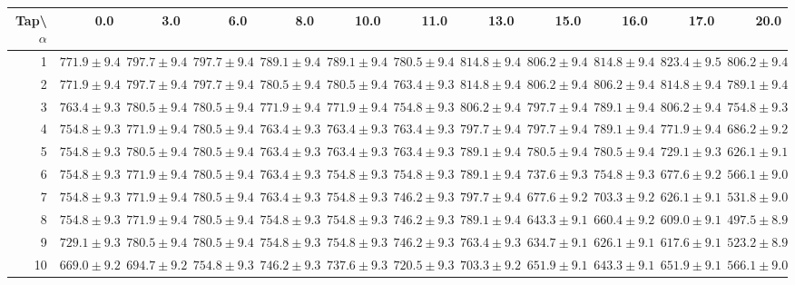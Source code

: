 \documentclass[runningheads]{llncs}
\begin{document}
\begin{table}
\begin{center}
\begin{tabular}{rrrrrrrrrrrr}
\toprule
{}Tap\textbackslash$\alpha$ &           0.0  &           3.0  &           6.0  &           8.0  &           10.0 &    
       11.0 &           13.0 &           15.0 &           16.0 &           17.0 &           20.0 \\
\midrule
1  &  $771.9\pm9.4$ &  $797.7\pm9.4$ &  $797.7\pm9.4$ &  $789.1\pm9.4$ &  $789.1\pm9.4$ &  $780.5\pm9.4$ &  $814.8\pm9.4$ &  $806.2\pm9.4$ &  $814.8\pm9.4$ &  $823.4\pm9.5$ &  $806.2\pm9.4$ \\
2  &  $771.9\pm9.4$ &  $797.7\pm9.4$ &  $797.7\pm9.4$ &  $780.5\pm9.4$ &  $780.5\pm9.4$ &  $763.4\pm9.3$ &  $814.8\pm9.4$ &  $806.2\pm9.4$ &  $806.2\pm9.4$ &  $814.8\pm9.4$ &  $789.1\pm9.4$ \\
3  &  $763.4\pm9.3$ &  $780.5\pm9.4$ &  $780.5\pm9.4$ &  $771.9\pm9.4$ &  $771.9\pm9.4$ &  $754.8\pm9.3$ &  $806.2\pm9.4$ &  $797.7\pm9.4$ &  $789.1\pm9.4$ &  $806.2\pm9.4$ &  $754.8\pm9.3$ \\
4  &  $754.8\pm9.3$ &  $771.9\pm9.4$ &  $780.5\pm9.4$ &  $763.4\pm9.3$ &  $763.4\pm9.3$ &  $763.4\pm9.3$ &  $797.7\pm9.4$ &  $797.7\pm9.4$ &  $789.1\pm9.4$ &  $771.9\pm9.4$ &  $686.2\pm9.2$ \\
5  &  $754.8\pm9.3$ &  $780.5\pm9.4$ &  $780.5\pm9.4$ &  $763.4\pm9.3$ &  $763.4\pm9.3$ &  $763.4\pm9.3$ &  $789.1\pm9.4$ &  $780.5\pm9.4$ &  $780.5\pm9.4$ &  $729.1\pm9.3$ &  $626.1\pm9.1$ \\
6  &  $754.8\pm9.3$ &  $771.9\pm9.4$ &  $780.5\pm9.4$ &  $763.4\pm9.3$ &  $754.8\pm9.3$ &  $754.8\pm9.3$ &  $789.1\pm9.4$ &  $737.6\pm9.3$ &  $754.8\pm9.3$ &  $677.6\pm9.2$ &  $566.1\pm9.0$ \\
7  &  $754.8\pm9.3$ &  $771.9\pm9.4$ &  $780.5\pm9.4$ &  $763.4\pm9.3$ &  $754.8\pm9.3$ &  $746.2\pm9.3$ &  $797.7\pm9.4$ &  $677.6\pm9.2$ &  $703.3\pm9.2$ &  $626.1\pm9.1$ &  $531.8\pm9.0$ \\
8  &  $754.8\pm9.3$ &  $771.9\pm9.4$ &  $780.5\pm9.4$ &  $754.8\pm9.3$ &  $754.8\pm9.3$ &  $746.2\pm9.3$ &  $789.1\pm9.4$ &  $643.3\pm9.1$ &  $660.4\pm9.2$ &  $609.0\pm9.1$ &  $497.5\pm8.9$ \\
9  &  $729.1\pm9.3$ &  $780.5\pm9.4$ &  $780.5\pm9.4$ &  $754.8\pm9.3$ &  $754.8\pm9.3$ &  $746.2\pm9.3$ &  $763.4\pm9.3$ &  $634.7\pm9.1$ &  $626.1\pm9.1$ &  $617.6\pm9.1$ &  $523.2\pm8.9$ \\
10 &  $669.0\pm9.2$ &  $694.7\pm9.2$ &  $754.8\pm9.3$ &  $746.2\pm9.3$ &  $737.6\pm9.3$ &  $720.5\pm9.3$ &  $703.3\pm9.2$ &  $651.9\pm9.1$ &  $643.3\pm9.1$ &  $651.9\pm9.1$ &  $566.1\pm9.0$ \\

\end{tabular}
\end{center}
\end{table}
\end{document}
